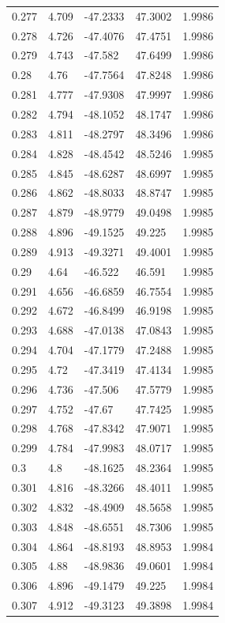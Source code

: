 \begin{tabular}{lllll}
0.277 & 4.709 & -47.2333 & 47.3002 & 1.9986 \\
0.278 & 4.726 & -47.4076 & 47.4751 & 1.9986 \\
0.279 & 4.743 & -47.582 & 47.6499 & 1.9986 \\
0.28 & 4.76 & -47.7564 & 47.8248 & 1.9986 \\
0.281 & 4.777 & -47.9308 & 47.9997 & 1.9986 \\
0.282 & 4.794 & -48.1052 & 48.1747 & 1.9986 \\
0.283 & 4.811 & -48.2797 & 48.3496 & 1.9986 \\
0.284 & 4.828 & -48.4542 & 48.5246 & 1.9985 \\
0.285 & 4.845 & -48.6287 & 48.6997 & 1.9985 \\
0.286 & 4.862 & -48.8033 & 48.8747 & 1.9985 \\
0.287 & 4.879 & -48.9779 & 49.0498 & 1.9985 \\
0.288 & 4.896 & -49.1525 & 49.225 & 1.9985 \\
0.289 & 4.913 & -49.3271 & 49.4001 & 1.9985 \\
0.29 & 4.64 & -46.522 & 46.591 & 1.9985 \\
0.291 & 4.656 & -46.6859 & 46.7554 & 1.9985 \\
0.292 & 4.672 & -46.8499 & 46.9198 & 1.9985 \\
0.293 & 4.688 & -47.0138 & 47.0843 & 1.9985 \\
0.294 & 4.704 & -47.1779 & 47.2488 & 1.9985 \\
0.295 & 4.72 & -47.3419 & 47.4134 & 1.9985 \\
0.296 & 4.736 & -47.506 & 47.5779 & 1.9985 \\
0.297 & 4.752 & -47.67 & 47.7425 & 1.9985 \\
0.298 & 4.768 & -47.8342 & 47.9071 & 1.9985 \\
0.299 & 4.784 & -47.9983 & 48.0717 & 1.9985 \\
0.3 & 4.8 & -48.1625 & 48.2364 & 1.9985 \\
0.301 & 4.816 & -48.3266 & 48.4011 & 1.9985 \\
0.302 & 4.832 & -48.4909 & 48.5658 & 1.9985 \\
0.303 & 4.848 & -48.6551 & 48.7306 & 1.9985 \\
0.304 & 4.864 & -48.8193 & 48.8953 & 1.9984 \\
0.305 & 4.88 & -48.9836 & 49.0601 & 1.9984 \\
0.306 & 4.896 & -49.1479 & 49.225 & 1.9984 \\
0.307 & 4.912 & -49.3123 & 49.3898 & 1.9984 \\

\end{tabular}
